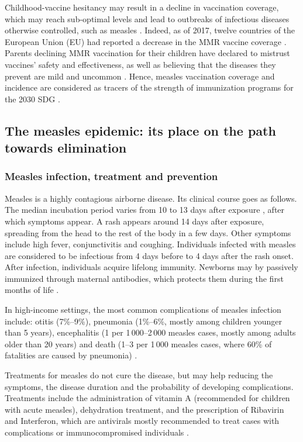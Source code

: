 Childhood-vaccine hesitancy may result in a decline in vaccination coverage, which may reach sub-optimal levels and lead to outbreaks of infectious diseases otherwise controlled, such as measles \cite[]{Strebel2013}. Indeed, as of 2017, twelve countries of the European Union (EU) had reported a decrease in the MMR vaccine coverage \cite[]{Larson2018}. Parents declining MMR vaccination for their children have declared to mistrust vaccines' safety and effectiveness, as well as believing that the diseases they prevent are mild and uncommon \cite[]{Brown2010}. Hence, measles vaccination coverage and incidence are considered as tracers of the strength of immunization programs for the 2030 SDG \cite[]{WHO_IA2030}. 
 

\subsection{The measles epidemic: its place on the path towards elimination}
\subsubsection{Measles infection, treatment and prevention}
Measles is a highly contagious airborne disease. Its clinical course goes as follows. The median incubation period varies from 10 to 13 days after exposure \cite[]{CDC_Measles2015,Strebel2013}, after which symptoms appear. A rash appears around 14 days after exposure, spreading from the head to the rest of the body in a few days. Other symptoms include high fever, conjunctivitis and coughing. Individuals infected with measles are considered to be infectious from 4 days before to 4 days after the rash onset. After infection, individuals acquire lifelong immunity. Newborns may by passively immunized through maternal antibodies, which protects them during the first months of life \cite[]{Strebel2013}.

In high-income settings, the most common complications of measles infection include: otitis (7\%--9\%), pneumonia (1\%--6\%, mostly among children younger than 5 years), encephalitis (1 per 1\,000--2\,000 measles cases, mostly among adults older than 20 years) and death (1--3 per 1\,000 measles cases, where 60\% of fatalities are caused by pneumonia) \cite[]{Strebel2013}.

Treatments for measles do not cure the disease, but may help reducing the symptoms, the disease duration and the probability of developing complications. Treatments include the administration of vitamin A (recommended for children with acute measles), dehydration treatment, and the prescription of Ribavirin and Interferon, which are antivirals mostly recommended to treat cases with complications or immunocompromised individuals \cite[]{Strebel2013}.

